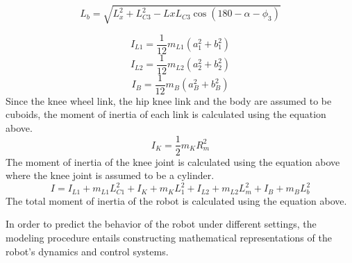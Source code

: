 
	\begin{equation}
		L_b = \sqrt{L_{x}^2 + L_{C3}^2 - Lx L_{C3} \cos(180 - \alpha - \phi_3 )}
	\end{equation}

	\begin{equation}
		I_{L1} = \frac{1}{12} m_{L1} (a_1^2 + b_1^2)
	\end{equation}
	\begin{equation}
		I_{L2} = \frac{1}{12} m_{L2} (a_2^2 + b_2^2)
	\end{equation}
	\begin{equation}
		I_B = \frac{1}{12} m_B (a_B^2 + b_B^2)
	\end{equation}
Since the knee wheel link, the hip knee link and the body are assumed to be cuboids, the moment of inertia of each link is calculated using the equation above.
	\begin{equation}
		I_K = \frac{1}{2} m_K R_m^2
	\end{equation}
	The moment of inertia of the knee joint is calculated using the equation above where the knee joint is assumed to be a cylinder.
	\begin{equation}
		I = I_{L1} + m_{L1} L_{C1}^2 + I_K + m_K L_1^2 + I_{L2} + m_{L2} L_m^2 + I_B + m_B L_b^2
	\end{equation}
	The total moment of inertia of the robot is calculated using the equation above.


	In order to predict the behavior of the robot under different settings, the modeling procedure entails constructing mathematical representations of the robot's dynamics and control systems.







	
	
